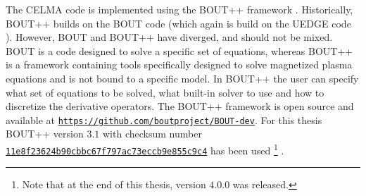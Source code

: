 \label{chap:BOUT++}
The CELMA code is implemented using the BOUT++ framework \cite{Dudson2009,Dudson2014a,Dudson2016}.
Historically, BOUT++ builds on the BOUT code \cite{Xu1998} (which again is build on the UEDGE code \cite{Rognlien1996}).
However, BOUT and BOUT++ have diverged, and should not be mixed.
BOUT is a code designed to solve a specific set of equations, whereas BOUT++ is a framework containing tools specifically designed to solve magnetized plasma equations and is not bound to a specific model.
In BOUT++ the user can specify what set of equations to be solved, what built-in solver to use and how to discretize the derivative operators.
The BOUT++ framework is open source and available at \href{https://github.com/boutproject/BOUT-dev}{\texttt{https://github.com/boutproject/BOUT-dev}}.
For this thesis BOUT++ version $3.1$ with checksum number \href{https://github.com/boutproject/BOUT-dev/releases/tag/v3.1}{\texttt{11e8f23624b90cbbc67f797ac73eccb9e855c9c4}} has been used%
%
\footnote{Note that at the end of this thesis, version $4.0.0$ was released.}%
%
.

